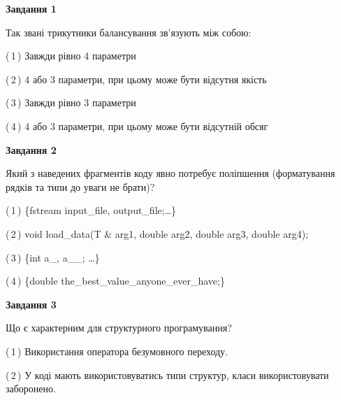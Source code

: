 \documentclass[10pt, ukrainian]{article}
\begin{document}
{
\begin {large}
{\begin {center}\textbf{Завдання 1}\end {center}}\par
Так звані трикутники балансування зв'язують між собою:\par
\vspace{2mm}



(\,1\,) Завжди рівно 4 параметри%



(\,2\,) 4 або 3 параметри, при цьому може бути відсутня якість%



(\,3\,) Завжди рівно 3 параметри%



(\,4\,) 4 або 3 параметри, при цьому може бути відсутній обсяг %


{\begin {center}\textbf{Завдання 2}\end {center}}\par
Який з наведених фрагментів коду явно потребує поліпшення (форматування рядків та типи до уваги не брати)?\par
\vspace{2mm}



(\,1\,) \{fstream input\_file, output\_file;…\} %



(\,2\,) void load\_data(T \& arg1, double arg2, double arg3, double arg4); %



(\,3\,) \{int a\_, a\_\_; …\}%



(\,4\,) \{double the\_best\_value\_anyone\_ever\_have;\} %


{\begin {center}\textbf{Завдання 3}\end {center}}\par
Що є характерним для структурного програмування?\par
\vspace{2mm}



(\,1\,) Використання оператора безумовного переходу. %



(\,2\,) У коді мають використовуватись типи структур, класи використовувати заборонено. %




\end{large}}
\end{document}

